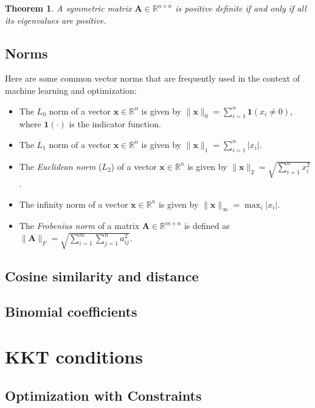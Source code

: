 \documentclass[11pt]{book} %
\newtheorem{theorem}{Theorem}[section]
\begin{document}
\begin{theorem}
A symmetric matrix \(\mathbf{A} \in \mathbb{R}^{n \times n}\) is positive definite if and only if all its eigenvalues are positive.
\end{theorem}

\subsection{Norms}
Here are some common vector norms that are frequently used in the context of machine learning and optimization:
\begin{itemize}
    \item The $L_0$ norm of a vector \(\mathbf{x} \in \mathbb{R}^n\) is given by \(\lVert \mathbf{x} \rVert_0 = \sum_{i=1}^{n} \mathbf{1}(x_i \neq 0)\), where \(\mathbf{1}(\cdot)\) is the indicator function.
    \item The $L_1$ norm of a vector \(\mathbf{x} \in \mathbb{R}^n\) is given by \(\lVert \mathbf{x} \rVert_1 = \sum_{i=1}^{n} \lvert x_i \rvert\).
    \item The \textit{Euclidean norm} ($L_2$) of a vector \(\mathbf{x} \in \mathbb{R}^n\) is given by \(\lVert \mathbf{x} \rVert_2 = \sqrt{\sum_{i=1}^{n} x_i^2}\).
    \item The infinity norm of a vector \(\mathbf{x} \in \mathbb{R}^n\) is given by \(\lVert \mathbf{x} \rVert_{\infty} = \max_{i} \lvert x_i \rvert\).
    \item The \textit{Frobenius norm} of a matrix \(\mathbf{A} \in \mathbb{R}^{m \times n}\) is defined as \(\lVert \mathbf{A} \rVert_F = \sqrt{\sum_{i=1}^{m} \sum_{j=1}^{n} a_{ij}^2}\).
\end{itemize}

\subsection{Cosine similarity and distance}

\subsection{Binomial coefficients}

%
%
%

\section{KKT conditions}
\subsection{Optimization with Constraints}
\end{document}
